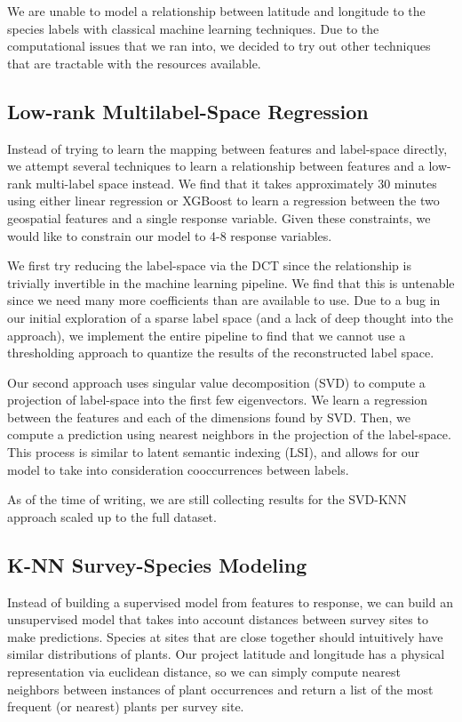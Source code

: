\documentclass[]{style/ceurart}
\begin{document}
We are unable to model a relationship between latitude and longitude to the species labels with classical machine learning techniques. 
Due to the computational issues that we ran into, we decided to try out other techniques that are tractable with the resources available. 

\subsection{Low-rank Multilabel-Space Regression}

Instead of trying to learn the mapping between features and label-space directly, we attempt several techniques to learn a relationship between features and a low-rank multi-label space instead. 
We find that it takes approximately 30 minutes using either linear regression or XGBoost to learn a regression between the two geospatial features and a single response variable. 
Given these constraints, we would like to constrain our model to 4-8 response variables. 

We first try reducing the label-space via the DCT since the relationship is trivially invertible in the machine learning pipeline. 
We find that this is untenable since we need many more coefficients than are available to use. 
Due to a bug in our initial exploration of a sparse label space (and a lack of deep thought into the approach), we implement the entire pipeline to find that we cannot use a thresholding approach to quantize the results of the reconstructed label space.

Our second approach uses singular value decomposition (SVD) to compute a projection of label-space into the first few eigenvectors. 
We learn a regression between the features and each of the dimensions found by SVD. 
Then, we compute a prediction using nearest neighbors in the projection of the label-space. 
This process is similar to latent semantic indexing (LSI), and allows for our model to take into consideration cooccurrences between labels. 

As of the time of writing, we are still collecting results for the SVD-KNN approach scaled up to the full dataset.

\subsection{K-NN Survey-Species Modeling}

Instead of building a supervised model from features to response, we can build an unsupervised model that takes into account distances between survey sites to make predictions. 
Species at sites that are close together should intuitively have similar distributions of plants. 
Our project latitude and longitude has a physical representation via euclidean distance, so we can simply compute nearest neighbors between instances of plant occurrences and return a list of the most frequent (or nearest) plants per survey site.
\end{document}
